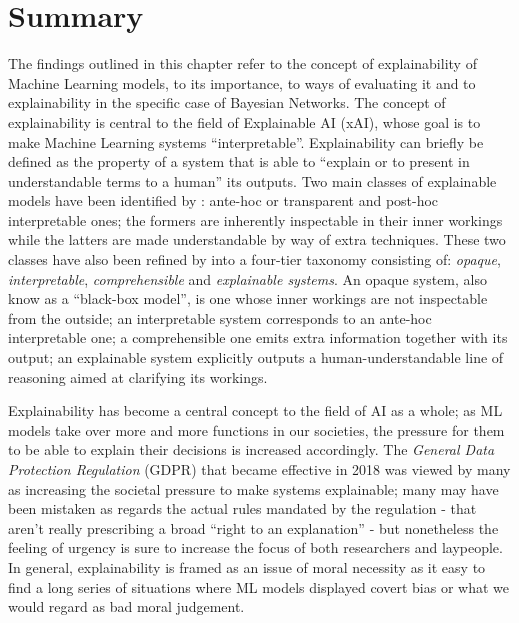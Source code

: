 \section{Summary} \label{sec:literature-review-summary}
The findings outlined in this chapter refer to the concept of explainability of Machine Learning models, to its importance, to ways of evaluating it and to explainability in the specific case of Bayesian Networks.
The concept of explainability is central to the field of Explainable AI (xAI), whose goal is to make Machine Learning systems \enquote{interpretable}.
Explainability can briefly be defined as the property of a system that is able to \enquote{explain or to present in understandable terms to a human} \citep{dosilovic2018} its outputs.
Two main classes of explainable models have been identified by \citet{mittelstadt2019explaining}: ante-hoc or transparent and post-hoc interpretable ones; the formers are inherently inspectable in their inner workings while the latters are made understandable by way of extra techniques.
These two classes have also been refined by \citet{doshi2017towards} into a four-tier taxonomy consisting of: \textit{opaque}, \textit{interpretable}, \textit{comprehensible} and \textit{explainable systems}.
An opaque system, also know as a \enquote{black-box model}, is one whose inner workings are not inspectable from the outside; an interpretable system corresponds to an ante-hoc interpretable one; a comprehensible one emits extra information together with its output; an explainable system explicitly outputs a human-understandable line of reasoning aimed at clarifying its workings.

Explainability has become a central concept to the field of AI as a whole; as ML models take over more and more functions in our societies, the pressure for them to be able to explain their decisions is increased accordingly.
The \textit{General Data Protection Regulation} (GDPR) that became effective in 2018 was viewed by many as increasing the societal pressure to make systems explainable; many may have been mistaken as regards the actual rules mandated by the regulation - that aren't really prescribing a broad \enquote{right to an explanation} \citep{edwards2018enslaving} - but nonetheless the feeling of urgency is sure to increase the focus of both researchers and laypeople.
In general, explainability is framed as an issue of moral necessity as it easy to find a long series of situations where ML models displayed covert bias or what we would regard as bad moral judgement.

